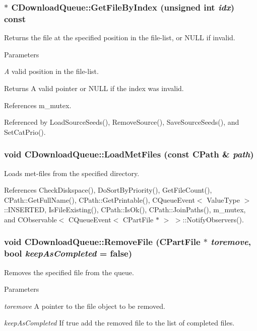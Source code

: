 \subsubsection[{GetFileByIndex}]{ $\ast$ CDownloadQueue::GetFileByIndex (unsigned int {\em idx}) const}\label{classCDownloadQueue_aab959e5772c45a300f591638db1b93da}


Returns the file at the specified position in the file-\/list, or NULL if invalid. 
\begin{DoxyParams}{Parameters}
\item[{\em A}]valid position in the file-\/list. \end{DoxyParams}
\begin{DoxyReturn}{Returns}
A valid pointer or NULL if the index was invalid. 
\end{DoxyReturn}


References m\_\-mutex.

Referenced by LoadSourceSeeds(), RemoveSource(), SaveSourceSeeds(), and SetCatPrio().
\subsubsection[{LoadMetFiles}]{\setlength{\rightskip}{0pt plus 5cm}void CDownloadQueue::LoadMetFiles (const {\bf CPath} \& {\em path})}\label{classCDownloadQueue_a122349774932a2db46ab23e3e134cd4f}


Loads met-\/files from the specified directory. 

References CheckDiskspace(), DoSortByPriority(), GetFileCount(), CPath::GetFullName(), CPath::GetPrintable(), CQueueEvent$<$ ValueType $>$::INSERTED, IsFileExisting(), CPath::IsOk(), CPath::JoinPaths(), m\_\-mutex, and CObservable$<$ CQueueEvent$<$ CPartFile $\ast$ $>$ $>$::NotifyObservers().
\subsubsection[{RemoveFile}]{\setlength{\rightskip}{0pt plus 5cm}void CDownloadQueue::RemoveFile ({\bf CPartFile} $\ast$ {\em toremove}, \/  bool {\em keepAsCompleted} = {\ttfamily false})}\label{classCDownloadQueue_a70203682ccc5df6a45c55c1d9c809cc2}


Removes the specified file from the queue. 
\begin{DoxyParams}{Parameters}
\item[{\em toremove}]A pointer to the file object to be removed. \item[{\em keepAsCompleted}]If true add the removed file to the list of completed files. \end{DoxyParams}


